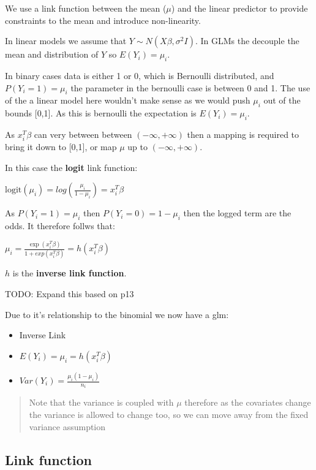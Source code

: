 \documentclass[
  letterpaper,
  DIV=11,
  numbers=noendperiod]{scrreprt}
\providecommand{\tightlist}{%
  \setlength{\itemsep}{0pt}\setlength{\parskip}{0pt}}\usepackage{longtable,booktabs,array}
\begin{document}
We use a link function between the mean (\(\mu\)) and the linear
predictor to provide constraints to the mean and introduce
non-linearity.

In linear models we assume that \(Y \sim N(X\beta, \sigma^2 I)\). In
GLMs the decouple the mean and distribution of \(Y\) so
\(E(Y_i)=\mu_i\).

In binary cases data is either 1 or 0, which is Bernoulli distributed,
and \(P(Y_i =1) = \mu_i\) the parameter in the bernoulli case is between
0 and 1. The use of the a linear model here wouldn't make sense as we
would push \(\mu_i\) out of the bounds {[}0,1{]}. As this is bernoulli
the expectation is \(E(Y_i) = \mu_i\).

As \(x_i^T\beta\) can very between between \((-\infty, + \infty)\) then
a mapping is required to bring it down to {[}0,1{]}, or map \(\mu\) up
to \((-\infty, + \infty)\).

In this case the \textbf{logit} link function:

\(\text{logit}(\mu_i) = log(\frac{\mu_i}{1 - \mu_i}) = x_i^T\beta\)

As \(P(Y_i =1) = \mu_i\) then \(P(Y_i = 0) = 1 - \mu_i\) then the logged
term are the odds. It therefore follws that:

\(\mu_i = \frac{\exp(x_i^T\beta)}{1 + exp(x_i^T\beta)} = h(x_i^T\beta)\)

\(h\) is the \textbf{inverse link function}.

TODO: Expand this based on p13

Due to it's relationship to the binomial we now have a glm:

\begin{itemize}
\tightlist
\item
  Inverse Link
\item
  \(E(Y_i) = \mu_i = h(x_i^T\beta)\)
\item
  \(Var(Y_i) = \frac{\mu_i(1- \mu_i)}{n_i}\)
\end{itemize}

\begin{quote}
Note that the variance is coupled with \(\mu\) therefore as the
covariates change the variance is allowed to change too, so we can move
away from the fixed variance assumption
\end{quote}

\hypertarget{link-function}{%
\subsection{Link function}\label{link-function}}
\end{document}

